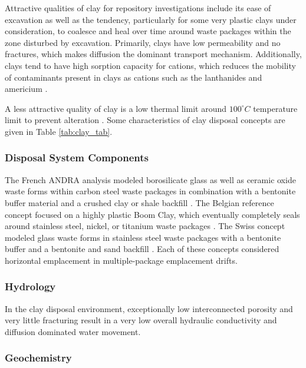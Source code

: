 Attractive qualities of clay for repository investigations include its ease of 
excavation as well as the tendency, particularly for some very plastic clays 
under consideration, to coalesce and heal over time around waste packages within the 
zone disturbed by excavation. Primarily, clays have low permeability and no 
fractures, which makes diffusion the dominant transport mechanism. Additionally, clays tend to have high sorption 
capacity for cations, which reduces the mobility of contaminants present in 
clays as cations such as the lanthanides and americium \cite{higgo_clay_1987}. 

A less attractive quality of clay is a low thermal limit around $100^{\circ}C$ 
temperature limit to prevent alteration \cite{hardin_generic_2011}.  Some 
characteristics of clay disposal concepts are given in Table 
\ref{tab:clay_tab}.   



\subsubsection{Disposal System Components}

The French \gls{ANDRA}  analysis modeled borosilicate glass as well as ceramic 
oxide waste forms within carbon steel waste packages in combination with a bentonite 
buffer material and a crushed clay or shale backfill \cite{andra_argile:_2005}.
The Belgian reference concept focused on a highly plastic Boom Clay, which 
eventually completely seals around stainless steel, nickel, or titanium waste 
packages \cite{ondraf-niras_technical_2001}.  The Swiss concept modeled glass 
waste forms in stainless steel waste packages with a bentonite buffer and a 
bentonite and sand backfill
\cite{johnson_calculations_2002}. Each of these concepts considered 
horizontal emplacement in multiple-package emplacement drifts. 


\subsubsection{Hydrology}

In the clay disposal environment, exceptionally low interconnected porosity and 
very little fracturing result in a very low overall hydraulic conductivity and 
diffusion dominated water movement. 

\subsubsection{Geochemistry}


